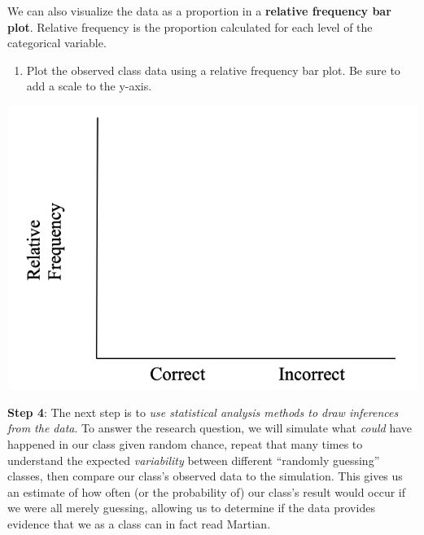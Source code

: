 \documentclass[
]{report}
\providecommand{\tightlist}{%
  \setlength{\itemsep}{0pt}\setlength{\parskip}{0pt}}
\begin{document}
We can also visualize the data as a proportion in a \textbf{relative frequency bar plot}. Relative frequency is the proportion calculated for each level of the categorical variable.

\begin{enumerate}
\def\labelenumi{\arabic{enumi}.}
\setcounter{enumi}{7}
\tightlist
\item
  Plot the observed class data using a relative frequency bar plot. Be sure to add a scale to the y-axis.
\end{enumerate}

\begin{center}\includegraphics[width=0.4\linewidth]{images/relative_barplot_martian} \end{center}

\newpage

\textbf{Step 4}: The next step is to \emph{use statistical analysis methods to draw inferences from the data}. To answer the research question, we will simulate what \emph{could} have happened in our class given random chance, repeat that many times to understand the expected \emph{variability} between different ``randomly guessing'' classes, then compare our class's observed data to the simulation. This gives us an estimate of how often (or the probability of) our class's result would occur if we were all merely guessing, allowing us to determine if the data provides evidence that we as a class can in fact read Martian.
\end{document}
